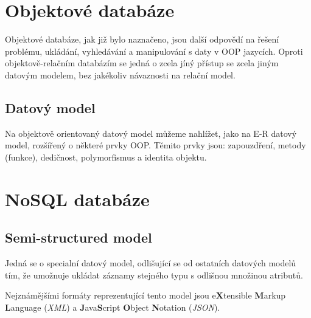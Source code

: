 \section{Objektové databáze}
Objektové databáze, jak již bylo naznačeno, jsou další odpovědí na řešení problému, ukládání, vyhledávání a manipulování s daty v OOP jazycích. Oproti objektově-relačním databázím se jedná o zcela jíný přístup se zcela jiným datovým modelem, bez jakékoliv návaznosti na relační model.

\subsection{Datový model}
Na objektově orientovaný datový model můžeme nahlížet, jako na E-R datový model, rozšířený o některé prvky OOP. Těmito prvky jsou: zapouzdření, metody (funkce), dedičnost, polymorfismus a identita objektu.

\section{NoSQL databáze}
\subsection{Semi-structured model}
Jedná se o specialní datový model, odlišující se od ostatních datových modelů tím, že umožnuje ukládat záznamy stejného typu s odlišnou množinou atributů.

Nejznámějšími formáty reprezentující tento model jsou e\textbf{X}tensible \textbf{M}arkup \textbf{L}anguage (\emph{XML}) a \textbf{J}ava\textbf{S}cript \textbf{O}bject \textbf{N}otation (\emph{JSON}).
